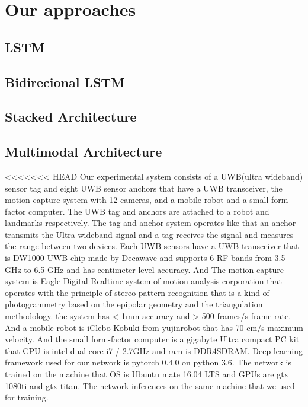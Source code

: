 \documentclass[letterpaper, 10 pt, conference]{ieeeconf}  %
\begin{document}
\section{Our approaches}
\subsection{LSTM}

\subsection{Bidirecional LSTM}

\subsection{Stacked Architecture}

\subsection{Multimodal Architecture}

<<<<<<< HEAD
 Our experimental system consists of a UWB(ultra wideband) sensor tag and eight UWB sensor anchors that have a UWB transceiver, the motion capture system with 12 cameras, and a mobile robot and a small form-factor computer. The UWB tag and anchors are attached to a robot and landmarks respectively. The tag and anchor system operates like that an anchor transmits the Ultra wideband signal and a tag receives the signal and measures the range between two devices. Each UWB sensors have a UWB transceiver that is DW1000 UWB-chip made by Decawave and supports 6 RF bands from 3.5 GHz to 6.5 GHz and has centimeter-level accuracy. And The motion capture system is Eagle Digital Realtime system of motion analysis corporation that operates with the principle of stereo pattern recognition that is a kind of photogrammetry based on the epipolar geometry and the triangulation methodology. the system has < 1mm accuracy and > 500 frames/s frame rate. And a mobile robot is iClebo Kobuki from yujinrobot that has 70 cm/s maximum velocity. And the small form-factor computer is a gigabyte Ultra compact PC kit that CPU is intel dual core i7 / 2.7GHz and ram is DDR4SDRAM.
 Deep learning framework used for our network is pytorch 0.4.0 on python 3.6. The network is trained on the machine that OS is Ubuntu mate 16.04 LTS and GPUs are gtx 1080ti and gtx titan. The network inferences on the same machine that we used for training.
 
\end{document}
